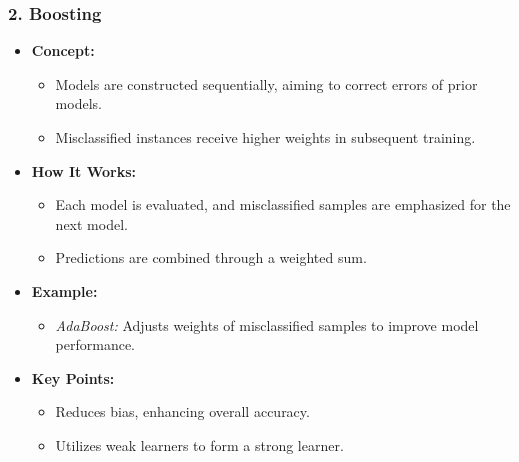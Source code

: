 \documentclass[aspectratio=169]{beamer}
\begin{document}
\begin{frame}[fragile]
    \frametitle{2. Boosting}
    \begin{itemize}
        \item \textbf{Concept:}
        \begin{itemize}
            \item Models are constructed sequentially, aiming to correct errors of prior models.
            \item Misclassified instances receive higher weights in subsequent training.
        \end{itemize}
        
        \item \textbf{How It Works:}
        \begin{itemize}
            \item Each model is evaluated, and misclassified samples are emphasized for the next model.
            \item Predictions are combined through a weighted sum.
        \end{itemize}
        
        \item \textbf{Example:}
        \begin{itemize}
            \item \textit{AdaBoost:} Adjusts weights of misclassified samples to improve model performance.
        \end{itemize}

        \item \textbf{Key Points:}
        \begin{itemize}
            \item Reduces bias, enhancing overall accuracy.
            \item Utilizes weak learners to form a strong learner.
        \end{itemize}
    \end{itemize}
\end{frame}
\end{document}
